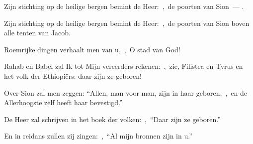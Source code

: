 \documentclass[12pt,twoside,a5paper]{article}
\begin{document}


\begin{halfparskip}
\end{halfparskip}

\begin{halfparskip}
\end{halfparskip}

\begin{halfparskip}
   Zijn stichting op de heilige bergen bemint de Heer:~\sep\ de poorten van Sion~--- .

  Zijn stichting op de heilige bergen bemint de Heer:~\sep\ de poorten van Sion boven alle tenten van Jacob.

  Roemrijke dingen verhaalt men van u,~\sep\ O stad van God!

  Rahab en Babel zal Ik tot Mijn vereerders rekenen:~\sep\ zie, Filistea en Tyrus en het volk der Ethiopiërs: daar zijn ze geboren!

  Over Sion zal men zeggen: ``Allen, man voor man, zijn in haar geboren,~\sep\ en de Allerhoogste zelf heeft haar bevestigd.''

  De Heer zal schrijven in het boek der volken:~\sep\ ``Daar zijn ze geboren.''

  En in reidans zullen zij zingen:~\sep\ ``Al mijn bronnen zijn in u.''
\end{halfparskip}
\end{document}
